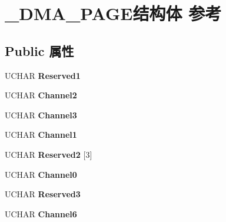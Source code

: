 \hypertarget{struct___d_m_a___p_a_g_e}{}\section{\+\_\+\+D\+M\+A\+\_\+\+P\+A\+G\+E结构体 参考}
\label{struct___d_m_a___p_a_g_e}
\subsection*{Public 属性}
\begin{DoxyCompactItemize}
\item 
\mbox{\label{struct___d_m_a___p_a_g_e_ab90f36ab116c5c0229d8c9580c14d230}} 
U\+C\+H\+AR {\bfseries Reserved1}
\item 
\mbox{\label{struct___d_m_a___p_a_g_e_a753960dcde4a22ea517c5e384e9192f4}} 
U\+C\+H\+AR {\bfseries Channel2}
\item 
\mbox{\label{struct___d_m_a___p_a_g_e_af9c992327609ebbf849b70e89c04ab8a}} 
U\+C\+H\+AR {\bfseries Channel3}
\item 
\mbox{\label{struct___d_m_a___p_a_g_e_a53e9780ec94388fc277979f7f7f5faa2}} 
U\+C\+H\+AR {\bfseries Channel1}
\item 
\mbox{\label{struct___d_m_a___p_a_g_e_ae51453cd0d415f545d8bdb74e4894966}} 
U\+C\+H\+AR {\bfseries Reserved2} \mbox{[}3\mbox{]}
\item 
\mbox{\label{struct___d_m_a___p_a_g_e_a2ca8c3c0ec47f356d0882e4147954502}} 
U\+C\+H\+AR {\bfseries Channel0}
\item 
\mbox{\label{struct___d_m_a___p_a_g_e_a11d3bd032e79f29bbedcaa24e842ee3f}} 
U\+C\+H\+AR {\bfseries Reserved3}
\item 
\mbox{\label{struct___d_m_a___p_a_g_e_a8338eb88ac8b51862bd069cd083cdb3a}} 
U\+C\+H\+AR {\bfseries Channel6}
\item 
\mbox{\label{struct___d_m_a___p_a_g_e_a91fd3d2363ba1c5abb0c83f10e6d38e1}} 

\end{DoxyCompactItemize}
